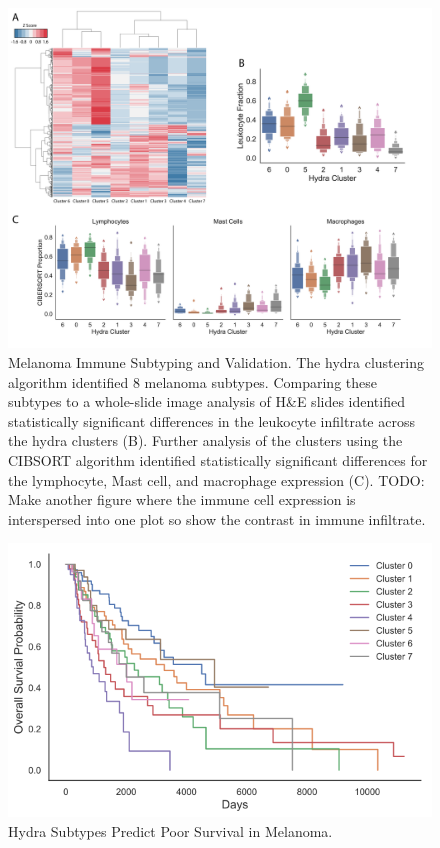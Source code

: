 \documentclass[fleqn,10pt]{wlscirep}
\begin{document}
\begin{figure}
	\centering
	\includegraphics[width=0.75\linewidth]{images/melanoma-immune-subtypes-immport-boxen@2x.png}
	\caption{Melanoma Immune Subtyping and Validation. The hydra clustering algorithm identified 8 melanoma subtypes. Comparing these subtypes to a whole-slide image analysis of H\&E slides identified statistically significant differences in the leukocyte infiltrate across the hydra clusters (B). Further analysis of the clusters using the CIBSORT algorithm identified statistically significant differences for the lymphocyte, Mast cell, and macrophage expression (C). TODO: Make another figure where the immune cell expression is interspersed into one plot so show the contrast in immune infiltrate.}
	\label{sfig:melanoma}
\end{figure}


\begin{figure}
	\centering
	\includegraphics[width=0.75\linewidth]{images/immport-skcm-cluster-survival.png}
	\caption{Hydra Subtypes Predict Poor Survival in Melanoma.}
	\label{sfig:melanoma-surv}
\end{figure}
\end{document}
